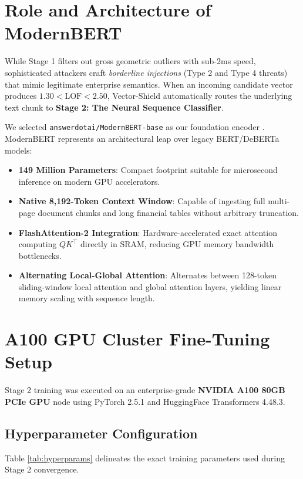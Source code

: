 \label{chap:stage2}
\section{Role and Architecture of ModernBERT}
While Stage 1 filters out gross geometric outliers with sub-2ms speed, sophisticated attackers craft \textit{borderline injections} (Type 2 and Type 4 threats) that mimic legitimate enterprise semantics. When an incoming candidate vector produces $1.30 < \text{LOF} < 2.50$, Vector-Shield automatically routes the underlying text chunk to \textbf{Stage 2: The Neural Sequence Classifier}.

We selected \texttt{answerdotai/ModernBERT-base} as our foundation encoder \cite{warner2024modernbert}. ModernBERT represents an architectural leap over legacy BERT/DeBERTa models:
\begin{itemize}
    \item \textbf{149 Million Parameters}: Compact footprint suitable for microsecond inference on modern GPU accelerators.
    \item \textbf{Native 8,192-Token Context Window}: Capable of ingesting full multi-page document chunks and long financial tables without arbitrary truncation.
    \item \textbf{FlashAttention-2 Integration}: Hardware-accelerated exact attention computing $Q K^\top$ directly in SRAM, reducing GPU memory bandwidth bottlenecks.
    \item \textbf{Alternating Local-Global Attention}: Alternates between 128-token sliding-window local attention and global attention layers, yielding linear memory scaling with sequence length.
\end{itemize}

\section{A100 GPU Cluster Fine-Tuning Setup}
Stage 2 training was executed on an enterprise-grade \textbf{NVIDIA A100 80GB PCIe GPU} node using PyTorch 2.5.1 and HuggingFace Transformers 4.48.3. 

\subsection{Hyperparameter Configuration}
Table \ref{tab:hyperparams} delineates the exact training parameters used during Stage 2 convergence.

